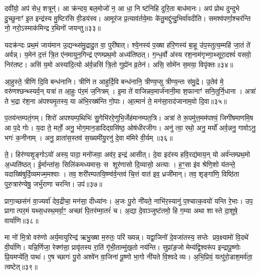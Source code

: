 दवी॑यो॒ अप॑ सेध॒ शत्रून्॑। आ क्र॑न्दय॒ बल॒मोजो॑ न॒ आ धा॒ नि ष्ट॑निहि दुरि॒ता बाध॑मानः। अप॑ प्रोथ दुन्दुभे दु॒च्छुनाꣳ॑ इ॒त इन्द्र॑स्य मु॒ष्टिर॑सि वी॒डय॑स्व। आमूर॑ज प्र॒त्याव॑र्तये॒माः के॑तु॒मद्दु॑न्दु॒भिर्वा॑वदीति। समश्व॑पर्णा॒श्चर॑न्ति नो॒ नरो॒ऽस्माक॑मिन्द्र र॒थिनो॑ जयन्तु॥३३॥

{\anuvakamend[{धन्व॑न्महि॒मानं॒ ब्राह्म॑णा॒सोऽदि॑तिः पृथि॒व्याः परि॑ दू॒रादेक॑चत्वारिशच्च॥६॥}]}

यदक्र॑न्दः प्रथ॒मं जाय॑मान उ॒द्यन्थ्स॑मु॒द्रादु॒त वा॒ पुरी॑षात्। श्ये॒नस्य॑ प॒ख्षा ह॑रि॒णस्य॑ बा॒हू उ॑प॒स्तुत्य॒म्महि॑ जा॒तं ते॑ अर्वन्न्। य॒मेन॑ द॒त्तं त्रि॒त ए॑नमायुन॒गिन्द्र॑ एणम्प्रथ॒मो अध्य॑तिष्ठत्। ग॒न्ध॒र्वो अ॑स्य रश॒नाम॑गृभ्णा॒थ्सूरा॒दश्वं॑ वसवो॒ निर॑तष्ट। असि॑ य॒मो अस्या॑दि॒त्यो अ॑र्व॒न्नसि॑ त्रि॒तो गुह्ये॑न व्र॒तेन॑। असि॒ सोमे॑न स॒मया॒ विपृ॑क्तः॥३४॥

आ॒हुस्ते॒ त्रीणि॑ दि॒वि बन्ध॑नानि। त्रीणि॑ त आहुर्दि॒वि बन्ध॑नानि॒ त्रीण्य॒प्सु त्रीण्य॒न्तः स॑मु॒द्रे। उ॒तेव॑ मे॒ वरु॑णश्छन्थ्स्यर्व॒न् यत्रा॑ त आ॒हुः प॑र॒मं ज॒नित्रम्। इ॒मा ते॑ वाजिन्नव॒मार्ज॑नानी॒मा श॒फानाꣳ॑ सनि॒तुर्नि॒धाना। अत्रा॑ ते भ॒द्रा र॑श॒ना अ॑पश्यमृ॒तस्य॒ या अ॑भि॒रख्ष॑न्ति गो॒पाः। आ॒त्मानं॑ ते॒ मन॑सा॒राद॑जानाम॒वो दि॒वा॥३५॥

प॒तय॑न्तम्पतं॒गम्। शिरो॑ अपश्यम्प॒थिभिः॑ सु॒गेभि॑ररे॒णुभि॒र्जेह॑मानम्पत॒त्रि। अत्रा॑ ते रू॒पमु॑त्त॒मम॑पश्यं॒ जिगी॑षमाणमि॒ष आ प॒दे गोः। य॒दा ते॒ मर्तो॒ अनु॒ भोग॒मान॒डादिद्ग्रसि॑ष्ठ॒ ओष॑धीरजीगः। अनु॑ त्वा॒ रथो॒ अनु॒ मर्यो॑ अर्व॒न्ननु॒ गावोऽनु॒ भगः॑ क॒नीनाम्। अनु॒ व्राता॑स॒स्तव॑ स॒ख्यमी॑यु॒रनु॑ दे॒वा म॑मिरे वी॒र्यम्॥३६॥

ते॒। हिर॑ण्यशृ॒ङ्गोऽयो॑ अस्य॒ पादा॒ मनो॑जवा॒ अव॑र॒ इन्द्र॑ आसीत्। दे॒वा इद॑स्य हवि॒रद्य॑माय॒न् यो अर्व॑न्तम्प्रथ॒मो अ॒ध्यति॑ष्ठत्। ई॒र्मान्ता॑सः॒ सिलि॑कमध्यमासः॒ स शूर॑णासो दि॒व्यासो॒ अत्याः। ह॒ꣳ॒सा इ॑व श्रेणि॒शो य॑तन्ते॒ यदाख्षि॑षुर्दि॒व्यमज्म॒मश्वाः। तव॒ शरी॑रम्पतयि॒ष्ण्व॑र्व॒न्तव॑ चि॒त्तं वात॑ इव॒ ध्रजी॑मान्। तव॒ शृङ्गा॑णि॒ विष्ठि॑ता पुरु॒त्रार॑ण्येषु॒ जर्भु॑राणा चरन्ति। उप॑॥३७॥

प्रागा॒च्छस॑नं वा॒ज्यर्वा॑ देव॒द्रीचा॒ मन॑सा॒ दीध्या॑नः। अ॒जः पु॒रो नी॑यते॒ नाभि॑र॒स्यानु॑ प॒श्चात्क॒वयो॑ यन्ति रे॒भाः। उप॒ प्रागात्पर॒मं यथ्स॒धस्थ॒मर्वा॒ꣳ॒ अच्छा॑ पि॒तर॑म्मा॒तरं॑ च। अ॒द्या दे॒वाञ्जुष्ट॑तमो॒ हि ग॒म्या अथा शास्ते दा॒शुषे॒ वार्या॑णि॥३८॥

{\anuvakamend[{विपृ॑क्तो दि॒वा वी॒र्य॑मुपैका॒न्नच॑त्वारि॒ꣳ॒शच्च॑॥७॥}]}

मा नो॑ मि॒त्रो वरु॑णो अर्य॒मायुरिन्द्र॑ ऋभु॒ख्षा म॒रुतः॒ परि॑ ख्यन्न्। यद्वा॒जिनो॑ दे॒वजा॑तस्य॒ सप्तेः प्रव॒क्ष्यामो॑ वि॒दथे॑ वी॒र्या॑णि। यन्नि॒र्णिजा॒ रेक्ण॑सा॒ प्रावृ॑तस्य रा॒तिं गृ॑भी॒ताम्मु॑ख॒तो नय॑न्ति। सुप्रा॑ङ॒जो मेम्य॑द्वि॒श्वरू॑प इन्द्रापू॒ष्णोः प्रि॒यमप्ये॑ति॒ पाथः॑। ए॒ष च्छागः॑ पु॒रो अश्वे॑न वा॒जिना॑ पू॒ष्णो भा॒गो नी॑यते वि॒श्वदेव्यः। अ॒भि॒प्रियं॒ यत्पु॑रो॒डाश॒मर्व॑ता॒ त्वष्टेत्॥३९॥

